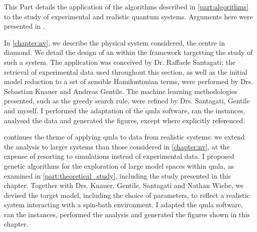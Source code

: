 \glsresetall
This Part details the application of the algorithms described in \cref{part:algorithms}
    to the study of experimental and realistic quantum systems.
Arguments here were presented in \cite{gentile2020learning}. 
\par 
\vspace{1cm}

In \cref{chapter:nv}, we describe the physical system considered, 
    the  centre in diamond. 
We detail the design of an  within the  framework
    targetting the study of such a system. 
The application was conceived by Dr. Raffaele Santagati; 
    the retrieval of experimental data used throughout this section, 
    as well as the initial model reduction to a set of sensible Hamilontonian terms,
    were performed by Drs. Sebastian Knauer and Andreas Gentile. 
The machine learning methodologies presented, 
    such as the greedy search rule, were refined by Drs. Santagati, Gentile and myself. 
I performed the adaptation of the \gls{qmla} software, 
    ran the instances, analysed the data and generated the figures, except where explicitly referenced.
\par 
\vspace{1cm}

 continues the theme of applying \gls{qmla} to data from realistic systems: 
    we extend the analysis to larger systems than those considered in \cref{chapter:nv}, 
    at the expense of resorting to simulations instead of experimental data. 
I proposed genetic algorithms for the exploration of large model spaces within \gls{qmla}, 
    as examined in \cref{part:theoretical_study}, including the study presented in this chapter. 
Together with Drs. Knauer, Gentile, Santagati and Nathan Wiebe, we devised the target model, 
    including the choice of parameters, to reflect a realistic system 
    interacting with a spin-bath environment.
I adapted the \gls{qmla} software, ran the instances, performed the analysis and generated the figures 
    shown in this chapter. 


